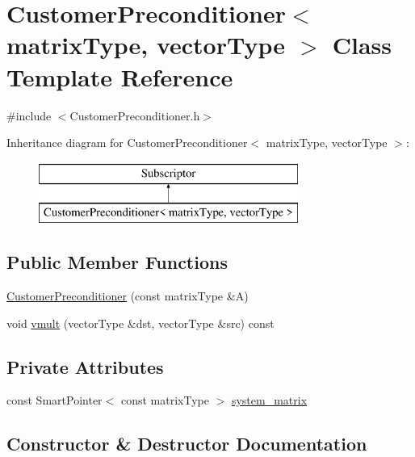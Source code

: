 \section{Customer\+Preconditioner$<$ matrix\+Type, vector\+Type $>$ Class Template Reference}
\label{class_customer_preconditioner}


{\ttfamily \#include $<$Customer\+Preconditioner.\+h$>$}

Inheritance diagram for Customer\+Preconditioner$<$ matrix\+Type, vector\+Type $>$\+:\begin{figure}[H]
\begin{center}
\leavevmode
\includegraphics[height=2.000000cm]{class_customer_preconditioner}
\end{center}
\end{figure}
\subsection*{Public Member Functions}
\begin{DoxyCompactItemize}
\item 
\mbox{\hyperlink{class_customer_preconditioner_a3603795be2fcda83add4d39b5905fbcf}{Customer\+Preconditioner}} (const matrix\+Type \&A)
\item 
void \mbox{\hyperlink{class_customer_preconditioner_a1daf83868b73ad6798ea7b70af6a96d8}{vmult}} (vector\+Type \&dst, vector\+Type \&src) const
\end{DoxyCompactItemize}
\subsection*{Private Attributes}
\begin{DoxyCompactItemize}
\item 
const Smart\+Pointer$<$ const matrix\+Type $>$ \mbox{\hyperlink{class_customer_preconditioner_a565a77476d06a1a0c5eaeb48b8fa3736}{system\+\_\+matrix}}
\end{DoxyCompactItemize}


\subsection{Constructor \& Destructor Documentation}
\mbox{\label{class_customer_preconditioner_a3603795be2fcda83add4d39b5905fbcf}} 
